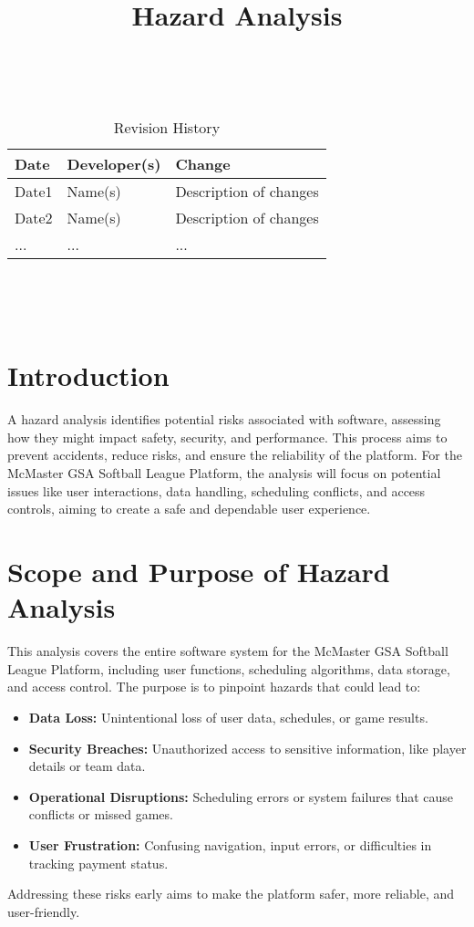 \documentclass{article}
\title{Hazard Analysis\\\progname}
\author{\authname}
\date{}
\begin{document}
\maketitle
\thispagestyle{empty}

~\newpage


\begin{table}[hp]
\caption{Revision History} \label{TblRevisionHistory}
\begin{tabularx}{\textwidth}{llX}
\toprule
\textbf{Date} & \textbf{Developer(s)} & \textbf{Change}\\
\midrule
Date1 & Name(s) & Description of changes\\
Date2 & Name(s) & Description of changes\\
... & ... & ...\\
\bottomrule
\end{tabularx}
\end{table}

~\newpage

\tableofcontents

~\newpage



\section{Introduction}
A hazard analysis identifies potential risks associated with software, assessing how they might impact safety, security, and performance. This process aims to prevent accidents, reduce risks, and ensure the reliability of the platform. For the McMaster GSA Softball League Platform, the analysis will focus on potential issues like user interactions, data handling, scheduling conflicts, and access controls, aiming to create a safe and dependable user experience.

\section{Scope and Purpose of Hazard Analysis}
This analysis covers the entire software system for the McMaster GSA Softball League Platform, including user functions, scheduling algorithms, data storage, and access control. The purpose is to pinpoint hazards that could lead to:
\begin{itemize}
    \item \textbf{Data Loss:} Unintentional loss of user data, schedules, or game results.
    \item \textbf{Security Breaches:} Unauthorized access to sensitive information, like player details or team data.
    \item \textbf{Operational Disruptions:} Scheduling errors or system failures that cause conflicts or missed games.
    \item \textbf{User Frustration:} Confusing navigation, input errors, or difficulties in tracking payment status.
\end{itemize}
Addressing these risks early aims to make the platform safer, more reliable, and user-friendly.
\end{document}
